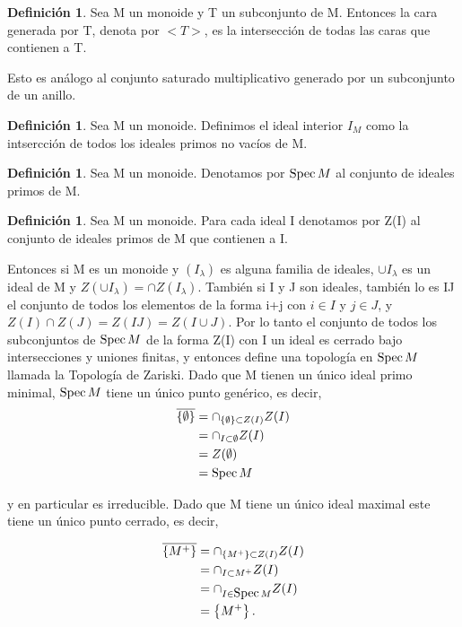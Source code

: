 \documentclass[12pt,spanish]{amsart}
\newcommand{\set}[1]{\left\{{#1}\right\}}
\def\Spec{\mathop{\mbox{\normalfont Spec}}\nolimits}
\theoremstyle{definition}
\newtheorem{Def}[Theorem]{Definición}
\theoremstyle{remark}
\begin{document}
\begin{Def}
Sea M un monoide y T un subconjunto de M. Entonces la cara generada por T, denota por $<T>$, es la intersección de todas las caras que contienen a T.  
\end{Def}

Esto es análogo al conjunto saturado multiplicativo generado por un subconjunto de un anillo. 

\begin{Def}
Sea M un monoide. Definimos el ideal interior $I_{M}$ como la intsercción de todos los ideales primos no vacíos de M. 
\end{Def}

\begin{Def}
Sea M un monoide. Denotamos por $\Spec{M}$ al conjunto de ideales primos de M.
\end{Def}

\begin{Def}
Sea M un monoide. Para cada ideal I denotamos por Z(I) al conjunto de ideales primos de M que contienen a I. 
\end{Def}

Entonces si M es un monoide y $(I_{\lambda})$ es alguna familia de ideales, $\cup I_{\lambda}$ es un ideal de M y $Z(\cup I_{\lambda}) = \cap Z(I_{\lambda})$.   También si I y J son ideales, también lo es IJ el conjunto de todos los elementos de la forma i+j con $i\in I$ y $j\in J$, y $Z(I)\cap Z(J)=Z(IJ)= Z(I\cup J)$. Por lo tanto el conjunto de todos los subconjuntos de $\Spec{M}$ de la forma Z(I) con I un ideal es cerrado bajo intersecciones y uniones finitas, y entonces define una topología en $\Spec{M}$ llamada la Topología de Zariski. Dado que M tienen un único ideal primo minimal, $\Spec{M}$ tiene un único punto genérico, es decir,
\begin{equation*}
\begin{split}
\overline{\set{\emptyset}} &= \cap_{\set{\emptyset} \subset Z(I)} Z(I) \\
&= \cap_{I \subset \emptyset} Z(I) \\
&= Z(\emptyset) \\
&= \Spec{M}
\end{split}
\end{equation*}

y en particular es irreducible. Dado que M tiene un único ideal maximal este tiene un único punto cerrado, es decir, 

\begin{equation*}
\begin{split}
\overline{\set{M^{+}}} &= \cap_{\set{M^{+}} \subset Z(I)} Z(I) \\
&= \cap_{I \subset M^{+}} Z(I) \\
&= \cap_{I\in \Spec{M}} Z(I) \\
&= \set{M^{+}}.
\end{split}
\end{equation*}
\end{document}
